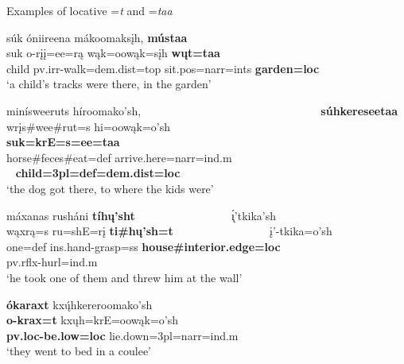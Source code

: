 \begin{exe}

\item\label{ExamplesOfTaa} Examples of locative =\textit{t} and =\textit{taa}

\begin{xlist}

\item\label{ExamplesOfTaa1} \glll súk óniireena mákoomaksįh, \textbf{mústaa}\\
    suk o-rįį=ee=rą wąk=oowąk=sįh \textbf{wųt=taa}\\
    \textnormal{child} pv.irr-\textnormal{walk}=dem.dist=top sit.pos=narr=ints \textbf{\textnormal{\bfseries garden}=loc}\\
    \glt `a child's tracks were there, in the garden' \citep[84]{hollow1973a}
    
\item\label{ExamplesOfTaa2} \glll minísweeruts híroomako'sh, ~ ~ ~ ~ ~ ~ ~ ~ ~ ~ ~ ~ ~ ~ ~ ~ ~ ~ ~ \textbf{súhkereseetaa}\\
    wrįs\#wee\#rut=s hi=oowąk=o'sh ~ ~ ~ ~ ~ ~ ~ ~ ~ ~ ~ ~ ~ ~ ~ ~ ~ ~ ~  \textbf{suk=krE=s=ee=taa}\\
    \textnormal{horse}\#\textnormal{feces}\#\textnormal{eat}=def \textnormal{arrive.here}=narr=ind.m ~ ~ ~ ~ ~ ~ ~ ~ ~ ~ ~ ~ ~ ~ ~ ~ ~ ~ ~ \textbf{\textnormal{\bfseries child}=3pl=def=dem.dist=loc}\\
    \glt `the dog got there, to where the kids were' \citep[180]{hollow1973a}
    
\item\label{ExamplesOfTaa3} \glll máxanas rusháni \textbf{tíhų'sht} ~ ~ ~ ~ ~ ~ ~ ~ ~ ~ \'{ı̨}'tkika'sh\\ 
    wąxrą=s ru=shE=rį \textbf{ti\#hų'sh=t} ~ ~ ~ ~ ~ ~ ~ ~ ~ ~  į'-tkika=o'sh\\
    \textnormal{one}=def ins.hand-\textnormal{grasp}=ss \textbf{\textnormal{\bfseries house}\#\textnormal{\bfseries interior.edge}=loc} ~ ~ ~ ~ ~ ~ ~ ~ ~ ~ pv.rflx-\textnormal{hurl}=ind.m\\
    \glt `he took one of them and threw him at the wall' \citep[158]{hollow1973a}

\item\label{ExamplesOfTaa4} \glll \textbf{ókaraxt} kxų́hkereroomako'sh\\
    \textbf{o-krax=t} kxųh=krE=oowąk=o'sh\\
    \textbf{pv.loc-\textnormal{\bfseries be.low}=loc} \textnormal{lie.down}=3pl=narr=ind.m\\
    \glt `they went to bed in a coulee' \citep[171]{hollow1973a}
    

\end{xlist}
\end{exe}
